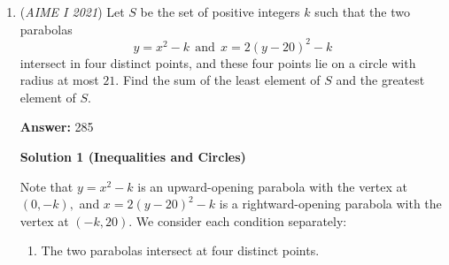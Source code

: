 \begin{enumerate}
 Let's first focus on $a+a^2+a^3+...+a^n\equiv 0\pmod{43}$. 

 This obviously holds true when $a$ is multiple of $43$, but that's not happening because $a$ is prime.

 If $a$ is $1\pmod{43}$, then $n$ must be a multiple of $43$.

 Notice that since $a+a^2+a^3+...+a^n$ is a finite geometric series, we can also express it as $\frac{a(a^{n}-1)}{a-1}$. We get $\frac{a(a^{n}-1)}{a-1}\equiv 0\pmod {43}$. Because $43$ is a prime number and $a-1\not\equiv 0\pmod{43}$, we can multiply both sides by $a-1$ and divide by $a$ to get $a^n-1\equiv 0\pmod{43}$, which simplifies to $a^n\equiv 1\pmod{43}$. By Fermat's Little Theorem, $n$ must be a multiple of $42$.

 Similarly, with $a+a^2+a^3+...+a^n\pmod{47}$, $n$ must be a multiple of $47$ and a multiple of $46$.

 ${lcm}(43, 47, 42, 46)=43*47*2*3*7*23$, which is the smallest possible value of $n$.

 The problem asks for the sum of $n$'s prime factors, so $43+47+2+3+7+23=\framebox{125}$.

 \textbf{Remark (Dirichlet's Theorem)} All solutions require Dirichlet's Theorem, which states that for any coprime positive integers $k$ and $r$, there are infinitely many primes $p$ congruent to $r\pmod{k}$.

 


	\item (\textit{AIME I 2021}) Let $S$ be the set of positive integers $k$ such that the two parabolas
 \[y=x^2-k~~\text{and}~~x=2(y-20)^2-k\]intersect in four distinct points, and these four points lie on a circle with radius at most $21$. Find the sum of the least element of $S$ and the greatest element of $S$.


 
 \textbf{Answer: }285



\textbf{Solution 1 (Inequalities and Circles)}

Note that $y=x^2-k$ is an upward-opening parabola with the vertex at $(0,-k),$ and $x=2(y-20)^2-k$ is a rightward-opening parabola with the vertex at $(-k,20).$ We consider each condition separately:

 
            \begin{enumerate} 
        \item The two parabolas intersect at four distinct points.


\end{enumerate}
\end{enumerate}
